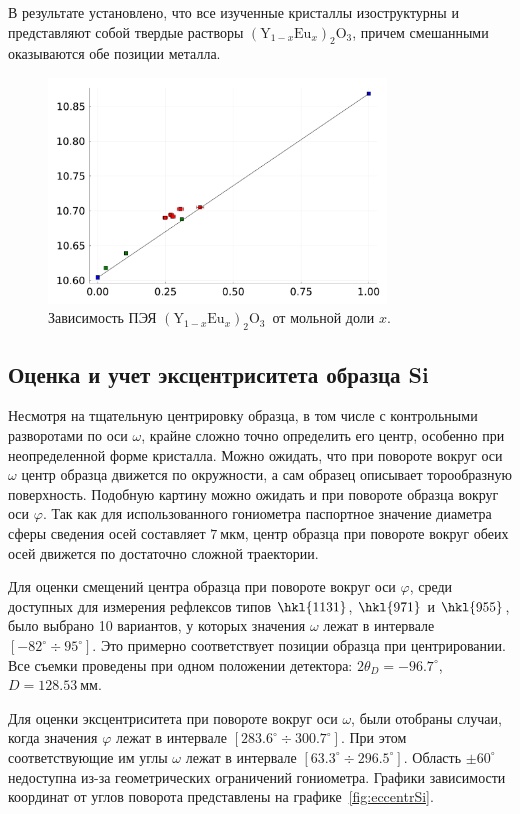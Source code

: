 \documentclass[a4paper,14pt]{extarticle}
\newcommand{\unit}[1]{ \ \text{#1}}
\newcommand{\degree}{^\circ}
\newcommand{\YEu}{${(\text{Y}_{1-x}\text{Eu}_x)}_2\text{O}_3$}
\newcommand{\range}[2]{[#1\div#2]}
\begin{document}
В результате установлено, что все изученные кристаллы изоструктурны и представляют собой твердые растворы \YEu, причем смешанными оказываются обе позиции металла.
\begin{figure}[ht!]
    \centering
    \includegraphics[width=0.8\textwidth]{YEu.pdf}
    \caption{Зависимость ПЭЯ \YEu~от мольной доли $x$.}
    \label{fig:YEu}
\end{figure}

\subsection{Оценка и учет эксцентриситета образца Si}
Несмотря на тщательную центрировку образца, в том числе с контрольными разворотами по оси $\omega$, крайне сложно точно определить его центр, особенно при неопределенной форме кристалла.
Можно ожидать, что при повороте вокруг оси $\omega$ центр образца движется по окружности, а сам образец описывает торообразную поверхность.
Подобную картину можно ожидать и при повороте образца вокруг оси $\varphi$.
Так как для использованного гониометра паспортное значение диаметра сферы сведения осей составляет $7\unit{мкм}$, центр образца при повороте вокруг обеих осей движется по достаточно сложной траектории.

Для оценки смещений центра образца при повороте вокруг оси $\varphi$, среди доступных для измерения рефлексов типов $\hkl{11 3 1}$, $\hkl{9 7 1}$ и $\hkl{9 5 5}$, было выбрано 10 вариантов, у которых значения $\omega$ лежат в интервале $\range{-82\degree}{95\degree}$.
Это примерно соответствует позиции образца при центрировании.
Все съемки проведены при одном положении детектора: $2\theta_D = -96.7\degree$, $D = 128.53\unit{мм}$.

Для оценки эксцентриситета при повороте вокруг оси $\omega$, были отобраны случаи, когда значения $\varphi$ лежат в интервале $\range{283.6\degree}{300.7\degree}$.
При этом соответствующие им углы $\omega$ лежат в интервале $\range{63.3\degree}{296.5\degree}$.
Область $\pm 60\degree$ недоступна из-за геометрических ограничений гониометра.
Графики зависимости координат от углов поворота представлены на графике~\ref{fig:eccentrSi}.
\end{document}
